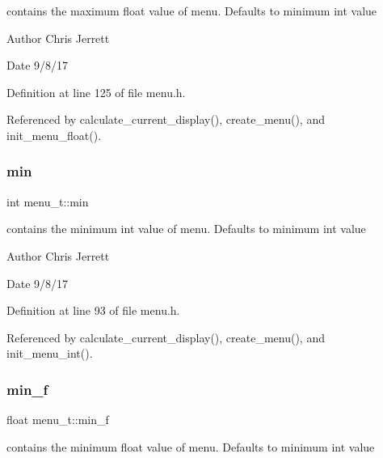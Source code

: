 contains the maximum float value of menu. Defaults to minimum int value 

\begin{DoxyAuthor}{Author}
Chris Jerrett 
\end{DoxyAuthor}
\begin{DoxyDate}{Date}
9/8/17 
\end{DoxyDate}


Definition at line 125 of file menu.\+h.



Referenced by calculate\+\_\+current\+\_\+display(), create\+\_\+menu(), and init\+\_\+menu\+\_\+float().

\mbox{\label{structmenu__t_a6891bc6c94f1e995cc62a05b13328de5}} 
\subsubsection{\texorpdfstring{min}{min}}
{\footnotesize\ttfamily int menu\+\_\+t\+::min}



contains the minimum int value of menu. Defaults to minimum int value 

\begin{DoxyAuthor}{Author}
Chris Jerrett 
\end{DoxyAuthor}
\begin{DoxyDate}{Date}
9/8/17 
\end{DoxyDate}


Definition at line 93 of file menu.\+h.



Referenced by calculate\+\_\+current\+\_\+display(), create\+\_\+menu(), and init\+\_\+menu\+\_\+int().

\mbox{\label{structmenu__t_a0a6e4f711992fb69e8a57c2af1ab7a05}} 
\subsubsection{\texorpdfstring{min\+\_\+f}{min\_f}}
{\footnotesize\ttfamily float menu\+\_\+t\+::min\+\_\+f}



contains the minimum float value of menu. Defaults to minimum int value 

